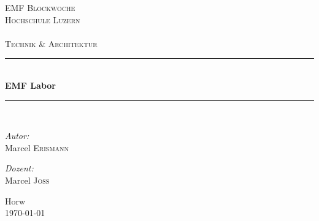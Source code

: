 \begin{titlepage}

\begin{center}

\textsc{\LARGE EMF Blockwoche}\\[1.5cm]

\textsc{\Large Hochschule Luzern\\
    ~\\
    Technik \& Architektur}\\[0.5cm]

\vfill{}

\newcommand{\HRule}{\rule{\linewidth}{0.5mm}}
\HRule \\[0.4cm]
{   \Huge \bfseries EMF Labor}\\

\HRule \\[1.5cm]

\begin{minipage}{0.4\textwidth}
    \begin{flushleft} \large
        \emph{Autor:}\\
        Marcel \textsc{Erismann}\\

    \end{flushleft}
\end{minipage}
\hfill
\begin{minipage}{0.4\textwidth}
    \begin{flushright} \large
        \emph{Dozent:} \\
        Marcel \textsc{Joss}
    \end{flushright}
\end{minipage}

\vfill{}
\vfill{}
\vfill{}

{\large Horw\\ \today}

\end{center}

\end{titlepage}
